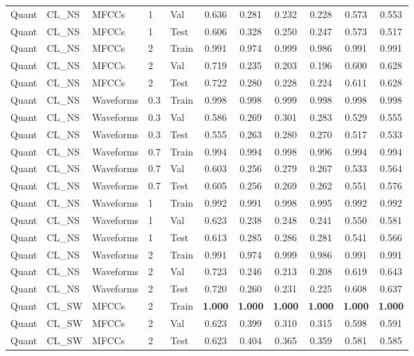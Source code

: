 \begin{landscape}
\begin{longtable}{|l|l|l|l|l|c|c|c|c|c|c|}
Quant & CL\_NS & MFCCs & 1 & Val & 0.636 & 0.281 & 0.232 & 0.228 & 0.573 & 0.553 \\
Quant & CL\_NS & MFCCs & 1 & Test & 0.606 & 0.328 & 0.250 & 0.247 & 0.573 & 0.517 \\
Quant & CL\_NS & MFCCs & 2 & Train & 0.991 & 0.974 & 0.999 & 0.986 & 0.991 & 0.991 \\
Quant & CL\_NS & MFCCs & 2 & Val & 0.719 & 0.235 & 0.203 & 0.196 & 0.600 & 0.628 \\
Quant & CL\_NS & MFCCs & 2 & Test & 0.722 & 0.280 & 0.228 & 0.224 & 0.611 & 0.628 \\
Quant & CL\_NS & Waveforms & 0.3 & Train & 0.998 & 0.998 & 0.999 & 0.998 & 0.998 & 0.998 \\
Quant & CL\_NS & Waveforms & 0.3 & Val & 0.586 & 0.269 & 0.301 & 0.283 & 0.529 & 0.555 \\
Quant & CL\_NS & Waveforms & 0.3 & Test & 0.555 & 0.263 & 0.280 & 0.270 & 0.517 & 0.533 \\
Quant & CL\_NS & Waveforms & 0.7 & Train & 0.994 & 0.994 & 0.998 & 0.996 & 0.994 & 0.994 \\
Quant & CL\_NS & Waveforms & 0.7 & Val & 0.603 & 0.256 & 0.279 & 0.267 & 0.533 & 0.564 \\
Quant & CL\_NS & Waveforms & 0.7 & Test & 0.605 & 0.256 & 0.269 & 0.262 & 0.551 & 0.576 \\
Quant & CL\_NS & Waveforms & 1 & Train & 0.992 & 0.991 & 0.998 & 0.995 & 0.992 & 0.992 \\
Quant & CL\_NS & Waveforms & 1 & Val & 0.623 & 0.238 & 0.248 & 0.241 & 0.550 & 0.581 \\
Quant & CL\_NS & Waveforms & 1 & Test & 0.613 & 0.285 & 0.286 & 0.281 & 0.541 & 0.566 \\
Quant & CL\_NS & Waveforms & 2 & Train & 0.991 & 0.974 & 0.999 & 0.986 & 0.991 & 0.991 \\
Quant & CL\_NS & Waveforms & 2 & Val & 0.723 & 0.246 & 0.213 & 0.208 & 0.619 & 0.643 \\
Quant & CL\_NS & Waveforms & 2 & Test & 0.720 & 0.260 & 0.231 & 0.225 & 0.608 & 0.637 \\
Quant & CL\_SW & MFCCs & 2 & Train & \textbf{1.000} & \textbf{1.000} & \textbf{1.000} & \textbf{1.000} & \textbf{1.000} & \textbf{1.000} \\
Quant & CL\_SW & MFCCs & 2 & Val & 0.623 & 0.399 & 0.310 & 0.315 & 0.598 & 0.591 \\
Quant & CL\_SW & MFCCs & 2 & Test & 0.623 & 0.404 & 0.365 & 0.359 & 0.581 & 0.585 \\

\end{longtable}
\end{landscape}
